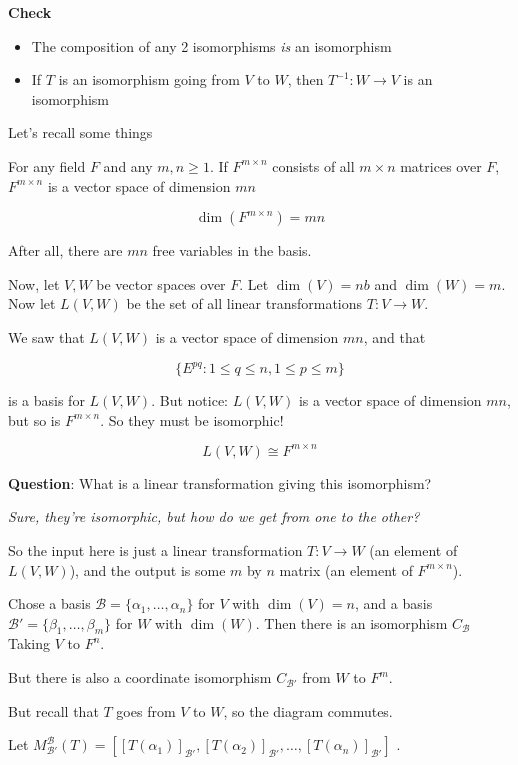 \documentclass[12pt]{article}
\def\B{\mathcal B}
\begin{document}
  {\bf Check}

  \begin{itemize}
    \item The composition of any 2 isomorphisms {\it is} an isomorphism
    \item If $T$ is an isomorphism going from $V$ to $W$, then $T^{-1}: W \to V$
      is an isomorphism
  \end{itemize}

  Let's recall some things

  For any field $F$ and any $m, n \ge 1$. If $F^{m \times n}$ consists of all $m
  \times n$ matrices over $F$, $F^{m \times n}$ is a vector space of dimension
  $mn$

  \[
    \dim(F^{m \times n}) = mn
  \]

  After all, there are $mn$ free variables in the basis.
  
  Now, let $V, W$ be vector spaces over $F$. Let $\dim(V) = nb$ and $\dim(W) =
  m$. Now let $L(V, W)$ be the set of all linear transformations $T: V \to W$.

  We saw that $L(V, W)$ is a vector space of dimension $mn$, and that

  \[
    \{E^{pq} : 1 \le q \le n, 1 \le p \le m\}
  \]
  
  is a basis for $L(V, W)$. But notice: $L(V, W)$ is a vector space of dimension
  $mn$, but so is $F^{m \times n}$. So they must be isomorphic!

  \[
    L(V, W) \cong F^{m \times n}
  \]

  {\bf Question}: What is a linear transformation giving this isomorphism?

  {\it Sure, they're isomorphic, but how do we get from one to the other?}

  So the input here is just a linear transformation $T: V \to W$ (an element of
  $L(V, W)$), and the output is some $m$ by $n$ matrix (an element of $F^{m
  \times n}$).

  Chose a basis $\B = \{\alpha_1, \dots, \alpha_n\}$ for $V$ with $\dim(V) =
  n$, and a basis $\B' = \{\beta_1, \dots, \beta_m\}$ for $W$ with $\dim(W)$.
  Then there is an isomorphism $C_{\B}$ Taking $V$ to $F^n$.

  But there is also a coordinate isomorphism $C_{\B'}$ from $W$ to $F^m$.

  But recall that $T$ goes from $V$ to $W$, so the diagram commutes. 

  Let $M_{\B'}^{\B}(T) = \left[ [T(\alpha_1)]_{\B'}, [T(\alpha_2)]_{\B'}, \dots,
  [T(\alpha_n)]_{\B'} \right]$ .
\end{document}
